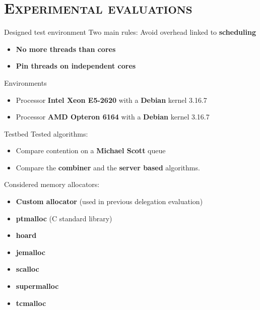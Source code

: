 \documentclass[xcolor=x11names,compress]{beamer}
\renewcommand{\(}{\begin{columns}}
\renewcommand{\)}{\end{columns}}
\newcommand{\<}[1]{\begin{column}{#1}}
\renewcommand{\>}{\end{column}}
\begin{document}

\section{\scshape Experimental evaluations}
\frame{\tableofcontents[currentsection]}






\begin{frame}{Designed test environment}
	Two main rules: Avoid overhead linked to \textbf{scheduling}
	\begin{itemize}
		\item \textbf{No more threads than cores}
		\item \textbf{Pin threads on independent cores}
	\end{itemize}

	\bigskip

	Environments
	\begin{itemize}
		\item Processor \textbf{Intel Xeon E5-2620} with a \textbf{Debian} kernel 3.16.7
		\item Processor \textbf{AMD Opteron 6164} with a \textbf{Debian} kernel 3.16.7
	\end{itemize}

\end{frame}



\begin{frame}{Testbed}
	Tested algorithms:
    \begin{itemize}
		\item Compare contention on a \textbf{Michael Scott} queue
        \item Compare the \textbf{combiner} and the \textbf{server based} algorithms.
	\end{itemize}

	\bigskip

	Considered memory allocators:
	\begin{itemize}
		\item \textbf{Custom allocator} (used in previous delegation evaluation)
        \item \textbf{ptmalloc} (C standard library)
        \item \textbf{hoard}
        \item \textbf{jemalloc}
        \item \textbf{scalloc}
        \item \textbf{supermalloc}
        \item \textbf{tcmalloc}
	\end{itemize}
\end{frame}
\end{document}
